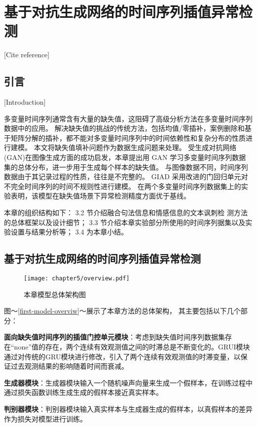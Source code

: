 
\chapter{基于对抗生成网络的时间序列插值异常检测}[Cite reference]

\section{引言}[Introduction]

多变量时间序列通常含有大量的缺失值，这阻碍了高级分析方法在多变量时间序列数据中的应用。
解决缺失值的挑战的传统方法，包括均值/零插补，案例删除和基于矩阵分解的插补，都不能对多变量时间序列中的时间依赖性和复杂分布的性质进行建模。
本文将缺失值填补问题作为数据生成问题来处理。
受生成对抗网络(GAN)在图像生成方面的成功启发，本章提出用 GAN 学习多变量时间序列数据集的总体分布，进一步用于生成每个样本的缺失值。
与图像数据不同，时间序列数据由于其记录过程的性质，往往是不完整的。
GIAD 采用改进的门回归单元对不完全时间序列的时间不规则性进行建模。
在两个多变量时间序列数据集上的实验表明，该模型在缺失值场景下异常检测精度方面优于基线。

本章的组织结构如下：
3.2 节介绍融合句法信息和情感信息的文本讽刺检 测方法的总体框架以及设计细节；
3.3 节介绍本章实验部分所使用的时间序列据集以及实验设置与结果分析等；
3.4 为本章小结。

\section{基于对抗生成网络的时间序列插值异常检测}
\begin{figure}[ht]
    \label{first-model-overview}
    \centering
    \texttt{[image: chapter5/overview.pdf]}
    \caption{本章模型总体架构图}
    \end{figure}
图～\ref{first-model-overviw}～展示了本章方法的总体架构， 其主要包括以下几个部分： 

\textbf{面向缺失值时间序列的插值门控单元模块}：考虑到缺失值时间序列数据集存在“none”值的存在，两个连续有效观测值之间的时滞总是不断变化的。GRUI模块
通过对传统的GRU模块进行修改，引入了两个连续有效观测值的时滞变量，以保证过去观测结果的影响随着时间而衰减。

\textbf{生成器模块}：生成器模块输入一个随机噪声向量来生成一个假样本，在训练过程中通过损失函数训练生成生成的假样本接近真实样本。

\textbf{判别器模块}：判别器模块输入真实样本与生成器生成的假样本，以真假样本的差异作为损失对模型进行训练。

